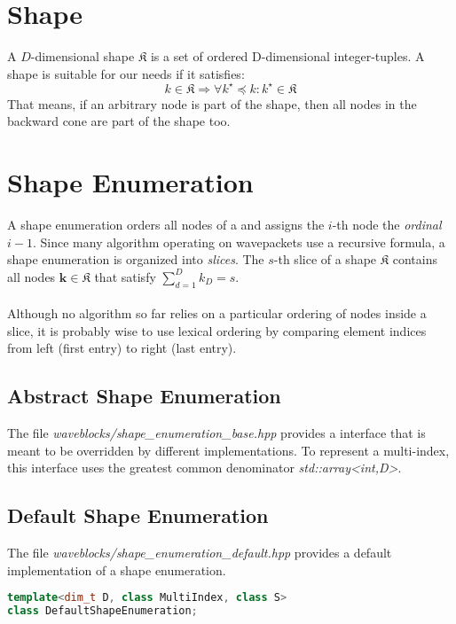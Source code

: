 \documentclass{article}
\begin{document}
\section{Shape}

A \(D\)-dimensional shape \(\mathfrak{K}\) is a set of ordered D-dimensional integer-tuples.
A shape is suitable for our needs if it satisfies:
\[k \in \mathfrak{K} \Rightarrow \forall k^\star \preceq k \colon k^\star \in \mathfrak{K}\]
That means, if an arbitrary node is part of the shape, then all nodes in the backward cone are part of the shape too.

\section{Shape Enumeration}

A shape enumeration orders all nodes of a and assigns the \(i\)-th node the \emph{ordinal} \(i-1\).
Since many algorithm operating on wavepackets use a recursive formula, a shape enumeration is organized into \emph{slices}. The \(s\)-th slice of a shape \(\mathfrak{K}\) contains all nodes \(\boldsymbol{k} \in \mathfrak{K} \) that satisfy \(\sum_{d=1}^{D} k_D = s\).
\\ \\
Although no algorithm so far relies on a particular ordering of nodes inside a slice, it is probably wise to use lexical ordering by comparing element indices from left (first entry) to right (last entry).

\subsection{Abstract Shape Enumeration}

The file \emph{waveblocks/shape\_enumeration\_base.hpp} provides a interface that is meant to be overridden by different implementations. To represent a multi-index, this interface uses the greatest common denominator \emph{std::array\textless int,D\textgreater}. 

\subsection{Default Shape Enumeration}

The file \emph{waveblocks/shape\_enumeration\_default.hpp} provides a default implementation of a shape enumeration.

\begin{lstlisting}[language=C++, caption={}]
template<dim_t D, class MultiIndex, class S>
class DefaultShapeEnumeration;
\end{lstlisting}
\end{document}
